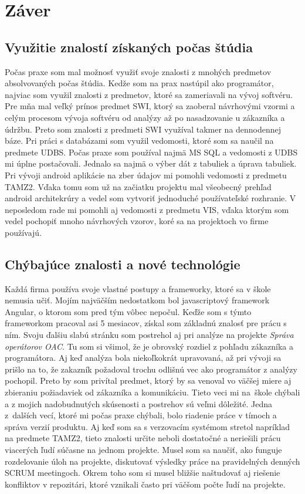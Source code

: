 \documentclass[11pt, oneside]{report}
\begin{document}
\chapter{Záver}
\section{Využitie znalostí získaných počas štúdia}
Počas praxe som mal možnosť využiť svoje znalosti z mnohých  predmetov absolvovaných počas štúdia. Kedže som na prax nastúpil ako programátor, najviac som využil znalosti z predmetov, ktoré sa zameriavali na vývoj softvéru. Pre mňa mal veľký prínos predmet SWI, ktorý sa zaoberal návrhovými vzormi a celým procesom  vývoja softvéru od analýzy až po nasadzovanie u zákazníka a údržbu. Preto som znalosti z predmeti SWI využíval takmer na dennodennej báze. Pri práci s databázami som využil vedomosti, ktoré som sa naučil na predmete UDBS. Počas praxe som používal najmä MS SQL a vedomosti z UDBS mi úplne postačovali. Jednalo sa najmä o  výber dát z tabuliek a  úprava tabuliek. Pri vývoji android aplikácie na zber údajov mi pomohli vedomosti z predmetu TAMZ2. Vďaka tomu som už  na začiatku projektu mal všeobecný prehľad android architekrúry a vedel som vytvoriť jednoduché používateľské rozhranie. V neposledom rade mi pomohli aj  vedomosti z predmetu VIS, vďaka ktorým som vedel pochopiť mnoho návrhových  vzorov, koré sa na projektoch vo firme používajú.
\section{Chýbajúce znalosti a nové technológie}
Každá firma používa  svoje vlastné postupy a frameworky, ktoré sa v škole  nemusia učiť. Mojím najväčším nedostatkom bol javascriptový framework Angular, o ktorom som pred tým vôbec nepočul. Keďže som s týmto frameworkom pracoval  asi 5 mesiacov,  získal som základnú znalosť pre prácu s ním. Svoju ďalšiu  slabú stránku som  postrehol  aj pri analýze  na projekte \textit{Správa operátorov OAC}. Tu som si všimol, že je obrovský rozdiel z pohľadu zákazníka a programátora. Aj keď analýza bola niekoľkokrát upravovaná, až pri vývoji sa prišlo na to, že zakazník požadoval  trochu odlišnú vec ako programátor z analýzy pochopil. Preto by som privítal predmet, ktorý by sa venoval vo väčšej miere aj zbieraniu požiadaviek od zákazníka a komunikáciu. Tieto veci mi na~škole chýbali a z mojich nadobudnutých skúsenosti a postrehov sú veľmi dôležité. Jedna z~dalších vecí, ktoré mi počas praxe chýbali, bolo riadenie práce v tímoch a správa verzií produktu. Aj keď som sa s verzovacím systémom stretol napríklad na predmete TAMZ2, tieto znalosti určite neboli dostatočné a neriešili prácu viacerých ľudí súčasne na jednom projekte. Musel som sa naučiť, ako funguje rozdelovanie úloh na projekte, diskutovať výsledky práce na pravidelných denných SCRUM meetingoch. Okrem toho som si musel bližšie naštudovať aj riešenie konfliktov v repozitári, ktoré  vznikali často pri  väčšom počte ľudí na projekte.
\end{document}
